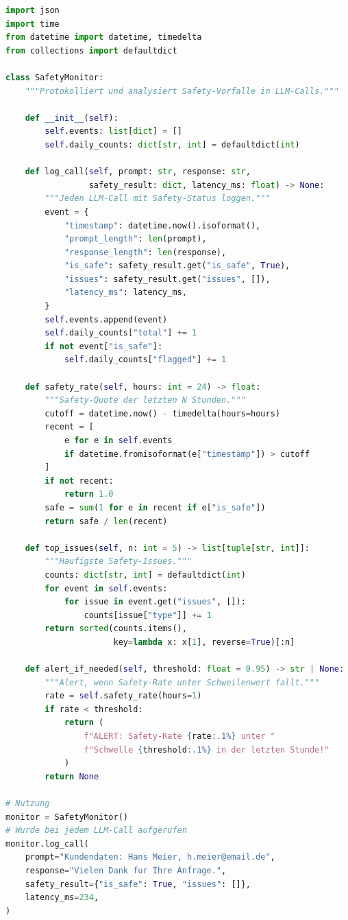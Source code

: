 \begin{lstlisting}[language=Python, caption={Safety-Monitoring mit Metrik-Export}, label=lst:safety-monitoring]
import json
import time
from datetime import datetime, timedelta
from collections import defaultdict

class SafetyMonitor:
    """Protokolliert und analysiert Safety-Vorfalle in LLM-Calls."""

    def __init__(self):
        self.events: list[dict] = []
        self.daily_counts: dict[str, int] = defaultdict(int)

    def log_call(self, prompt: str, response: str,
                 safety_result: dict, latency_ms: float) -> None:
        """Jeden LLM-Call mit Safety-Status loggen."""
        event = {
            "timestamp": datetime.now().isoformat(),
            "prompt_length": len(prompt),
            "response_length": len(response),
            "is_safe": safety_result.get("is_safe", True),
            "issues": safety_result.get("issues", []),
            "latency_ms": latency_ms,
        }
        self.events.append(event)
        self.daily_counts["total"] += 1
        if not event["is_safe"]:
            self.daily_counts["flagged"] += 1

    def safety_rate(self, hours: int = 24) -> float:
        """Safety-Quote der letzten N Stunden."""
        cutoff = datetime.now() - timedelta(hours=hours)
        recent = [
            e for e in self.events
            if datetime.fromisoformat(e["timestamp"]) > cutoff
        ]
        if not recent:
            return 1.0
        safe = sum(1 for e in recent if e["is_safe"])
        return safe / len(recent)

    def top_issues(self, n: int = 5) -> list[tuple[str, int]]:
        """Haufigste Safety-Issues."""
        counts: dict[str, int] = defaultdict(int)
        for event in self.events:
            for issue in event.get("issues", []):
                counts[issue["type"]] += 1
        return sorted(counts.items(),
                      key=lambda x: x[1], reverse=True)[:n]

    def alert_if_needed(self, threshold: float = 0.95) -> str | None:
        """Alert, wenn Safety-Rate unter Schweilenwert fallt."""
        rate = self.safety_rate(hours=1)
        if rate < threshold:
            return (
                f"ALERT: Safety-Rate {rate:.1%} unter "
                f"Schwelle {threshold:.1%} in der letzten Stunde!"
            )
        return None

# Nutzung
monitor = SafetyMonitor()
# Wurde bei jedem LLM-Call aufgerufen
monitor.log_call(
    prompt="Kundendaten: Hans Meier, h.meier@email.de",
    response="Vielen Dank fur Ihre Anfrage.",
    safety_result={"is_safe": True, "issues": []},
    latency_ms=234,
)
\end{lstlisting}

